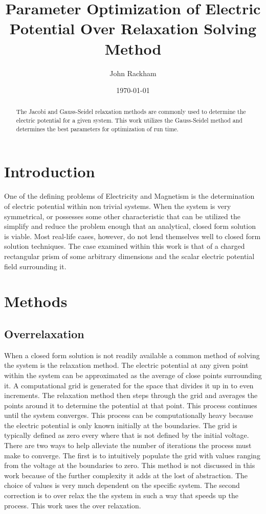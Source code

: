 \documentclass[aps,prb,twocolumn,amsfonts,showpacs,letterpaper]{revtex4}
\begin{document}
	\title{Parameter Optimization of Electric Potential Over Relaxation Solving Method}
	\author{John Rackham}
	\date{\today} 

\begin{abstract}
The Jacobi and Gauss-Seidel relaxation methods are commonly used to determine the electric potential for a given system. This work utilizes the Gauss-Seidel method and determines the best parameters for optimization of run time.
\end{abstract}

\maketitle

\section{Introduction}\label{intro}
One of the defining problems of Electricity and Magnetism is the determination of electric potential within non trivial systems. When the system is very symmetrical, or possesses some other characteristic that can be utilized the simplify and reduce the problem enough that an analytical, closed form solution is viable. Most real-life cases, however, do not lend themselves well to closed form solution techniques. The case examined within this work is that of a charged rectangular prism of some arbitrary dimensions  and the scalar electric potential field surrounding it.

\section{Methods}
\subsection{Overrelaxation}
When a closed form solution is not readily available a common method of solving the system is the relaxation method. The electric potential at any given point within the system can be approximated as the average of close points surrounding it.\cite{grif} A computational grid is generated for the space that divides it up in to even increments. The relaxation method then steps through the grid and averages the points around it to determine the potential at that point. This process continues until the system converges. This process can be computationally heavy because the electric potential is only known initially at the boundaries.  The grid is typically defined as zero every where that is not defined by the initial voltage. There are two ways to help alleviate the number of iterations the process must make to converge. The first is to intuitively populate the grid with values ranging from the voltage at the boundaries to zero. This method is not discussed in this work because of the further complexity it adds at the lost of abstraction. The choice of values is very much dependent on the specific system. The second correction is to over relax the the system in such a way that speeds up the process. This work uses the over relaxation.
\end{document}
